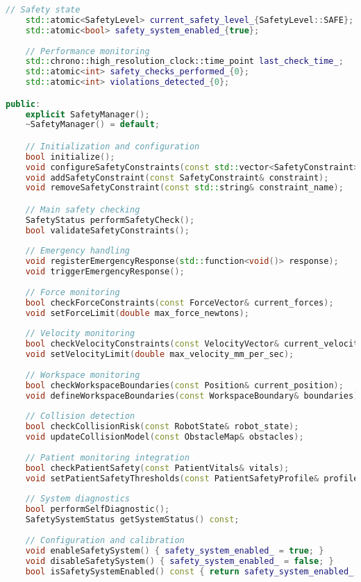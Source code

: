 \begin{lstlisting}[language=C++, caption={Safety Manager Core Implementation}, label={lst:app-safety-manager}]
    // Safety state
    std::atomic<SafetyLevel> current_safety_level_{SafetyLevel::SAFE};
    std::atomic<bool> safety_system_enabled_{true};
    
    // Performance monitoring
    std::chrono::high_resolution_clock::time_point last_check_time_;
    std::atomic<int> safety_checks_performed_{0};
    std::atomic<int> violations_detected_{0};

public:
    explicit SafetyManager();
    ~SafetyManager() = default;

    // Initialization and configuration
    bool initialize();
    void configureSafetyConstraints(const std::vector<SafetyConstraint>& constraints);
    void addSafetyConstraint(const SafetyConstraint& constraint);
    void removeSafetyConstraint(const std::string& constraint_name);

    // Main safety checking
    SafetyStatus performSafetyCheck();
    bool validateSafetyConstraints();
    
    // Emergency handling
    void registerEmergencyResponse(std::function<void()> response);
    void triggerEmergencyResponse();
    
    // Force monitoring
    bool checkForceConstraints(const ForceVector& current_forces);
    void setForceLimit(double max_force_newtons);
    
    // Velocity monitoring
    bool checkVelocityConstraints(const VelocityVector& current_velocity);
    void setVelocityLimit(double max_velocity_mm_per_sec);
    
    // Workspace monitoring
    bool checkWorkspaceBoundaries(const Position& current_position);
    void defineWorkspaceBoundaries(const WorkspaceBoundary& boundaries);
    
    // Collision detection
    bool checkCollisionRisk(const RobotState& robot_state);
    void updateCollisionModel(const ObstacleMap& obstacles);
    
    // Patient monitoring integration
    bool checkPatientSafety(const PatientVitals& vitals);
    void setPatientSafetyThresholds(const PatientSafetyProfile& profile);
    
    // System diagnostics
    bool performSelfDiagnostic();
    SafetySystemStatus getSystemStatus() const;
    
    // Configuration and calibration
    void enableSafetySystem() { safety_system_enabled_ = true; }
    void disableSafetySystem() { safety_system_enabled_ = false; }
    bool isSafetySystemEnabled() const { return safety_system_enabled_; }


\end{lstlisting}
